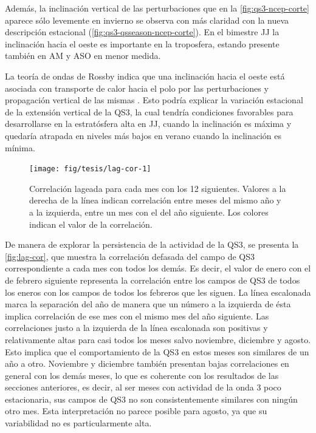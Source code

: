 \documentclass[spanish,a4paper,12pt,oneside]{book}
\begin{document}
Además, la inclinación vertical de las perturbaciones que en la
\autoref{fig:qs3-ncep-corte} aparece sólo levemente en invierno se
observa con más claridad con la nueva descripción estacional
(\autoref{fig:qs3-qsseason-ncep-corte}). En el bimestre JJ la
inclinación hacia el oeste es importante en la troposfera, estando
presente también en AM y ASO en menor medida.

La teoría de ondas de Rossby indica que una inclinación hacia el oeste
está asociada con transporte de calor hacia el polo por las
perturbaciones y propagación vertical de las mismas \citep{James}. Esto
podría explicar la variación estacional de la extensión vertical de la
QS3, la cual tendría condiciones favorables para desarrollarse en la
estratósfera alta en JJ, cuando la inclinación es máxima y quedaría
atrapada en niveles más bajos en verano cuando la inclinación es mínima.

\begin{figure}
\texttt{[image: fig/tesis/lag-cor-1]} \caption{Correlación lageada para cada mes con los 12 siguientes. Valores a la derecha de la línea indican correlación entre meses del mismo año y a la izquierda, entre un mes con el del año siguiente. Los colores indican el valor de la correlación. }\label{fig:lag-cor}
\end{figure}

De manera de explorar la persistencia de la actividad de la QS3, se
presenta la \autoref{fig:lag-cor}, que muestra la correlación defasada
del campo de QS3 correspondiente a cada mes con todos los demás. Es
decir, el valor de enero con el de febrero siguiente representa la
correlación entre los campos de QS3 de todos los eneros con los campos
de todos los febreros que les siguen. La línea escalonada marca la
separación del año de manera que un número a la izquierda de ésta
implica correlación de ese mes con el mismo mes del año siguiente. Las
correlaciones justo a la izquierda de la línea escalonada son positivas
y relativamente altas para casi todos los meses salvo noviembre,
diciembre y agosto. Esto implica que el comportamiento de la QS3 en
estos meses son similares de un año a otro. Noviembre y diciembre
también presentan bajas correlaciones en general con los demás meses, lo
que es coherente con los resultados de las secciones anteriores, es
decir, al ser meses con actividad de la onda 3 poco estacionaria, sus
campos de QS3 no son consistentemente similares con ningún otro mes.
Esta interpretación no parece posible para agosto, ya que su
variabilidad no es particularmente alta.
\end{document}
